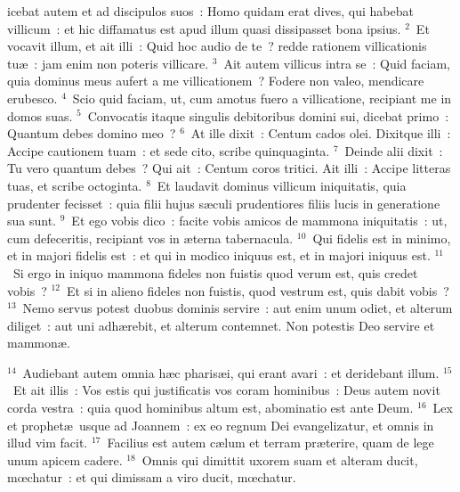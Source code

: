 \bchapter
{}icebat autem et ad discipulos suos~: Homo quidam erat dives, qui habebat villicum~: et hic diffamatus est apud illum quasi dissipasset bona ipsius.
${}^{2}$~Et vocavit illum, et ait illi~: Quid hoc audio de te~? redde rationem villicationis tu\ae~: jam enim non poteris villicare.
${}^{3}$~Ait autem villicus intra se~: Quid faciam, quia dominus meus aufert a me villicationem~? Fodere non valeo, mendicare erubesco.
${}^{4}$~Scio quid faciam, ut, cum amotus fuero a villicatione, recipiant me in domos suas.
${}^{5}$~Convocatis itaque singulis debitoribus domini sui, dicebat primo~: Quantum debes domino meo~?
${}^{6}$~At ille dixit~: Centum cados olei. Dixitque illi~: Accipe cautionem tuam~: et sede cito, scribe quinquaginta.
${}^{7}$~Deinde alii dixit~: Tu vero quantum debes~? Qui ait~: Centum coros tritici. Ait illi~: Accipe litteras tuas, et scribe octoginta.
${}^{8}$~Et laudavit dominus villicum iniquitatis, quia prudenter fecisset~: quia filii hujus s\ae culi prudentiores filiis lucis in generatione sua sunt.
${}^{9}$~Et ego vobis dico~: facite vobis amicos de mammona iniquitatis~: ut, cum defeceritis, recipiant vos in \ae terna tabernacula.
${}^{10}$~Qui fidelis est in minimo, et in majori fidelis est~: et qui in modico iniquus est, et in majori iniquus est.
${}^{11}$~Si ergo in iniquo mammona fideles non fuistis quod verum est, quis credet vobis~?
${}^{12}$~Et si in alieno fideles non fuistis, quod vestrum est, quis dabit vobis~?
${}^{13}$~Nemo servus potest duobus dominis servire~: aut enim unum odiet, et alterum diliget~: aut uni adh\ae rebit, et alterum contemnet. Non potestis Deo servire et mammon\ae .


${}^{14}$~Audiebant autem omnia h\ae c pharis\ae i, qui erant avari~: et deridebant illum.
${}^{15}$~Et ait illis~: Vos estis qui justificatis vos coram hominibus~: Deus autem novit corda vestra~: quia quod hominibus altum est, abominatio est ante Deum.
${}^{16}$~Lex et prophet\ae\ usque ad Joannem~: ex eo regnum Dei evangelizatur, et omnis in illud vim facit.
${}^{17}$~Facilius est autem c\ae lum et terram pr\ae terire, quam de lege unum apicem cadere.
${}^{18}$~Omnis qui dimittit uxorem suam et alteram ducit, mœchatur~: et qui dimissam a viro ducit, mœchatur.


